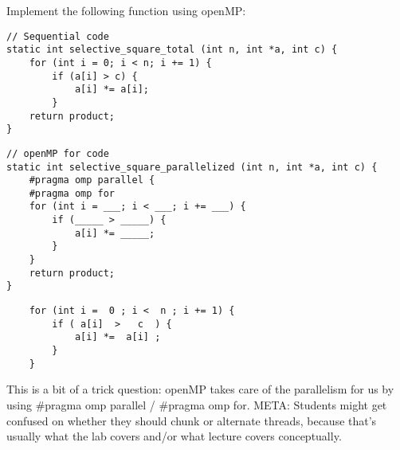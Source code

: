 \begin{blocksection}

\question
Implement the following function using openMP:
\begin{verbatim}
// Sequential code
static int selective_square_total (int n, int *a, int c) {
    for (int i = 0; i < n; i += 1) {
        if (a[i] > c) {
            a[i] *= a[i];
        }
    return product;
}   
\end{verbatim}

\begin{verbatim}
// openMP for code
static int selective_square_parallelized (int n, int *a, int c) {
    #pragma omp parallel {
    #pragma omp for
    for (int i = ___; i < ___; i += ___) {
        if (_____ > _____) {
            a[i] *= _____;
        }
    }
    return product;
}
\end{verbatim}

\begin{solution}[0.5in]
\begin{verbatim}
    for (int i =  0 ; i <  n ; i += 1) {
        if ( a[i]  >   c  ) {
            a[i] *=  a[i] ;
        }
    }
\end{verbatim}
This is a bit of a trick question: openMP takes care of the parallelism for us by using \#pragma omp parallel / \#pragma omp for.
META: Students might get confused on whether they should chunk or alternate threads, because that’s usually what the lab covers and/or what lecture covers conceptually.
\end{solution}
    
\end{blocksection}